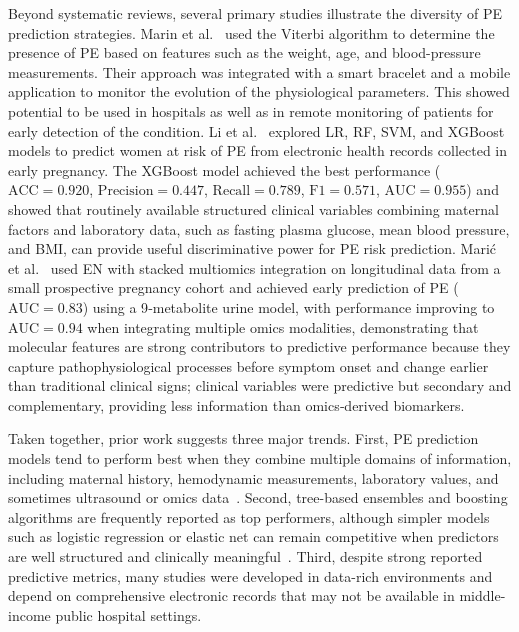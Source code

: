 \documentclass[diagnostics,article,submit,pdftex,moreauthors]{Definitions/mdpi}
\begin{document}
Beyond systematic reviews, several primary studies illustrate the
diversity of \ac{PE} prediction strategies. Marin et
al.~\cite{marin2019} used the Viterbi algorithm to determine the
presence of \ac{PE} based on features such as the weight, age,
and blood-pressure measurements. Their approach was integrated with a
smart bracelet and a mobile application to monitor the evolution of
the physiological parameters. This showed potential to be used in
hospitals as well as in remote monitoring of patients for early
detection of the condition. Li et al.~\cite{LI2021102} explored
\ac{LR}, \ac{RF}, \ac{SVM}, and XGBoost models to predict women at
risk of \ac{PE} from electronic health records collected in early
pregnancy. The XGBoost model achieved the best performance
($\mathrm{ACC}=0.920$, $\mathrm{Precision}=0.447$, $\mathrm{Recall}=0.789$,
$\mathrm{F1}=0.571$, $\mathrm{AUC}=0.955$) and showed that routinely available
structured clinical variables combining maternal factors and
laboratory data, such as fasting plasma glucose, mean blood pressure,
and \ac{BMI}, can provide useful discriminative power for \ac{PE}
risk prediction. Mari\'{c} et al.~\cite{mari__2022} used \ac{EN} with
stacked multiomics integration on longitudinal data from a small
prospective pregnancy cohort and achieved early prediction of
\ac{PE} ($\mathrm{AUC}=0.83$) using a 9‑metabolite urine model, with
performance improving to $\mathrm{AUC}=0.94$ when integrating multiple
omics modalities, demonstrating that molecular features are strong
contributors to predictive performance because they capture
pathophysiological processes before symptom onset and change earlier
than traditional clinical signs; clinical variables were predictive
but secondary and complementary, providing less information than
omics‑derived biomarkers.

Taken together, prior work suggests three major trends. First,
\ac{PE} prediction models tend to perform best when they combine
multiple domains of information, including maternal history,
hemodynamic measurements, laboratory values, and sometimes ultrasound
or omics data~\cite{Darsareh2024,Rahman2023,mennickent_2023}. Second,
tree-based ensembles and boosting algorithms are frequently reported
as top performers, although simpler models such as logistic
regression or elastic net can remain competitive when predictors are
well structured and clinically meaningful~\cite{Darsareh2024,LI2021102,mari__2020}.
Third, despite strong reported predictive metrics, many studies
were developed in data-rich environments and depend on comprehensive
electronic records that may not be available in middle-income public
hospital settings.
\end{document}
